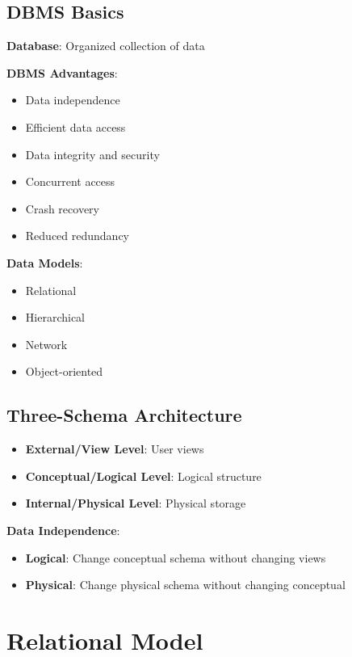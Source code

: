 \documentclass[12pt,a4paper]{report}
\begin{document}
\subsection{DBMS Basics}
\begin{concept}
\textbf{Database}: Organized collection of data

\textbf{DBMS Advantages}:
\begin{itemize}
    \item Data independence
    \item Efficient data access
    \item Data integrity and security
    \item Concurrent access
    \item Crash recovery
    \item Reduced redundancy
\end{itemize}

\textbf{Data Models}:
\begin{itemize}
    \item Relational
    \item Hierarchical
    \item Network
    \item Object-oriented
\end{itemize}
\end{concept}

\subsection{Three-Schema Architecture}
\begin{concept}
\begin{itemize}
    \item \textbf{External/View Level}: User views
    \item \textbf{Conceptual/Logical Level}: Logical structure
    \item \textbf{Internal/Physical Level}: Physical storage
\end{itemize}

\textbf{Data Independence}:
\begin{itemize}
    \item \textbf{Logical}: Change conceptual schema without changing views
    \item \textbf{Physical}: Change physical schema without changing conceptual
\end{itemize}
\end{concept}

\section{Relational Model}
\end{document}

